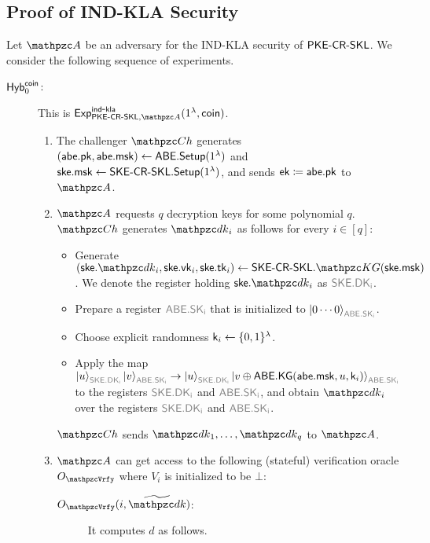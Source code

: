 \subsection{Proof of IND-KLA Security}
Let $\qA$ be an adversary for the IND-KLA security of $\mathsf{PKE}\textrm{-}\mathsf{CR}\textrm{-}\mathsf{SKL}$.
We consider the following sequence of experiments.
\begin{description}
\item[$\mathsf{Hyb}_{0}^{\mathsf{coin}}$:]This is $\expb{\PKECRSKL,\qA}{ind}{kla}(1^\secp,\coin)$.
\begin{enumerate}
\item The challenger $\qCh$ generates $(\mathsf{abe}.\mathsf{pk},\mathsf{abe}.\mathsf{msk})\leftarrow\mathsf{ABE}.\mathsf{Setup}(1^\lambda)$ and $\mathsf{ske}.\mathsf{msk}\leftarrow\mathsf{SKE}\textrm{-}\mathsf{CR}\textrm{-}\mathsf{SKL}.\mathsf{Setup}(1^\lambda)$, and sends $\mathsf{ek}\coloneqq\mathsf{abe}.\mathsf{pk}$ to $\qA$.

\item $\qA$ requests $q$ decryption keys for some polynomial $q$.
$\qCh$ generates $\qdk_i$ as follows for every $i\in[q]$:

\begin{itemize}
    \item Generate $(\ske.\qdk_i,\ske.\vk_i,\ske.\tk_i)\gets\SKECRSKL.\qKG(\ske.\msk)$. We denote the register holding $\ske.\qdk_i$ as $\qreg{SKE.DK_i}$.
    \item Prepare a register $\qreg{ABE.SK_i}$ that is initialized to $\ket{0\cdots0}_{\qreg{ABE.SK_i}}$.
    \item Choose explicit randomness $\mathsf{k}_i \leftarrow \{0,1\}^\lambda$.
    \item Apply the map
        $\ket{u}_{\qreg{SKE.DK_i}}\ket{v}_{\qreg{ABE.SK_i}}\ra\ket{u}_{\qreg{SKE.DK_i}}\ket{v\oplus\ABE.\KG(\abe.\msk,u,
        \key_i)}_{\qreg{ABE.SK_i}}$ to the registers $\qreg{SKE.DK_i}$ and $\qreg{ABE.SK_i}$, and obtain $\qdk_i$ over the registers $\qreg{SKE.DK_i}$ and $\qreg{ABE.SK_i}$.
\end{itemize}
$\qCh$ sends $\qdk_1,\ldots,\qdk_q$ to $\qA$.
\item $\qA$ can get access to the following (stateful) verification
oracle $\Oracle{\qVrfy}$ where $V_i$ is initialized to be $\bot$:

\begin{description}
\item[ $\Oracle{\qVrfy}(i,\widetilde{\qdk})$:] It computes $d$ as follows.  


\end{description}
\end{enumerate}
\end{description}
